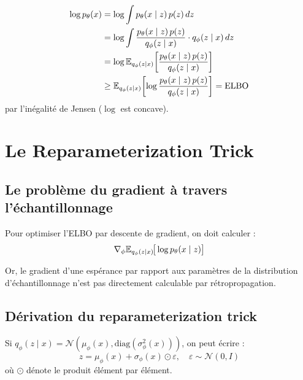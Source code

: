 \begin{proposition}
\begin{align}
\log p_\theta(x) &= \log \int p_\theta(x \mid z)\, p(z)\, dz \\
&= \log \int \frac{p_\theta(x \mid z)\, p(z)}{q_\phi(z \mid x)} \cdot q_\phi(z \mid x)\, dz \\
&= \log \mathbb{E}_{q_\phi(z|x)}\!\left[\frac{p_\theta(x \mid z)\, p(z)}{q_\phi(z \mid x)}\right] \\
&\geq \mathbb{E}_{q_\phi(z|x)}\!\left[\log \frac{p_\theta(x \mid z)\, p(z)}{q_\phi(z \mid x)}\right] = \text{ELBO}
\end{align}
par l'in\'egalit\'e de Jensen ($\log$ est concave).
\end{proposition}

\section{Le Reparameterization Trick}
\label{sec:reparam-trick}

\subsection{Le probl\`eme du gradient \`a travers l'\'echantillonnage}

Pour optimiser l'ELBO par descente de gradient, on doit calculer :
\begin{equation}
\nabla_\phi \mathbb{E}_{q_\phi(z|x)}\!\big[\log p_\theta(x \mid z)\big]
\end{equation}

Or, le gradient d'une esp\'erance par rapport aux param\`etres de la distribution d'\'echantillonnage n'est pas directement calculable par r\'etropropagation.

\subsection{D\'erivation du reparameterization trick}

\begin{theoreme}
Si $q_\phi(z \mid x) = \mathcal{N}(\mu_\phi(x), \text{diag}(\sigma^2_\phi(x)))$, on peut \'ecrire :
\begin{equation}
z = \mu_\phi(x) + \sigma_\phi(x) \odot \varepsilon, \quad \varepsilon \sim \mathcal{N}(0, I)
\label{eq:reparam}
\end{equation}
o\`u $\odot$ d\'enote le produit \'el\'ement par \'el\'ement.
\end{theoreme}


